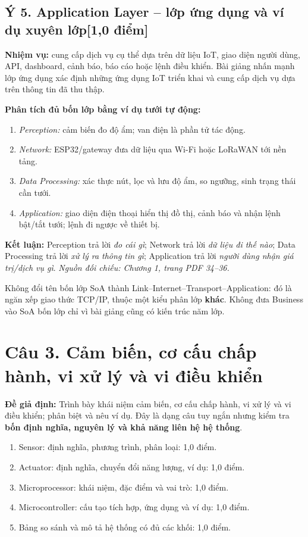 \documentclass[12pt,a4paper]{article}
\newcommand{\muc}[1]{\subsection*{#1\hfill{\color{teal}\normalsize [1,0 điểm]}}}
\newcommand{\nguon}[1]{{\small\itshape\color{navy}Nguồn đối chiếu: #1.}}
\begin{document}
\muc{Ý 5. Application Layer -- lớp ứng dụng và ví dụ xuyên lớp}
\textbf{Nhiệm vụ:} cung cấp dịch vụ cụ thể dựa trên dữ liệu IoT, giao diện người dùng, API, dashboard, cảnh báo, báo cáo hoặc lệnh điều khiển. Bài giảng nhấn mạnh lớp ứng dụng xác định những ứng dụng IoT triển khai và cung cấp dịch vụ dựa trên thông tin đã thu thập.

\textbf{Phân tích đủ bốn lớp bằng ví dụ tưới tự động:}
\begin{enumerate}
\item \emph{Perception:} cảm biến đo độ ẩm; van điện là phần tử tác động.
\item \emph{Network:} ESP32/gateway đưa dữ liệu qua Wi-Fi hoặc LoRaWAN tới nền tảng.
\item \emph{Data Processing:} xác thực nút, lọc và lưu độ ẩm, so ngưỡng, sinh trạng thái cần tưới.
\item \emph{Application:} giao diện điện thoại hiển thị đồ thị, cảnh báo và nhận lệnh bật/tắt tưới; lệnh đi ngược về thiết bị.
\end{enumerate}
\textbf{Kết luận:} Perception trả lời \emph{đo cái gì}; Network trả lời \emph{dữ liệu đi thế nào}; Data Processing trả lời \emph{xử lý ra thông tin gì}; Application trả lời \emph{người dùng nhận giá trị/dịch vụ gì}. \nguon{Chương 1, trang PDF 34--36}

\begin{luuy}
Không đổi tên bốn lớp SoA thành Link--Internet--Transport--Application: đó là ngăn xếp giao thức TCP/IP, thuộc một kiểu phân lớp \textbf{khác}. Không đưa Business vào SoA bốn lớp chỉ vì bài giảng cũng có kiến trúc năm lớp.
\end{luuy}

\newpage
\section{Câu 3. Cảm biến, cơ cấu chấp hành, vi xử lý và vi điều khiển}
\textbf{Đề giả định:} Trình bày khái niệm cảm biến, cơ cấu chấp hành, vi xử lý và vi điều khiển; phân biệt và nêu ví dụ. Đây là dạng câu tuy ngắn nhưng kiểm tra \textbf{bốn định nghĩa, nguyên lý và khả năng liên hệ hệ thống}.

\begin{barem}
\begin{enumerate}
\item Sensor: định nghĩa, phương trình, phân loại: 1,0 điểm.
\item Actuator: định nghĩa, chuyển đổi năng lượng, ví dụ: 1,0 điểm.
\item Microprocessor: khái niệm, đặc điểm và vai trò: 1,0 điểm.
\item Microcontroller: cấu tạo tích hợp, ứng dụng và ví dụ: 1,0 điểm.
\item Bảng so sánh và mô tả hệ thống có đủ các khối: 1,0 điểm.
\end{enumerate}
\end{barem}
\end{document}
